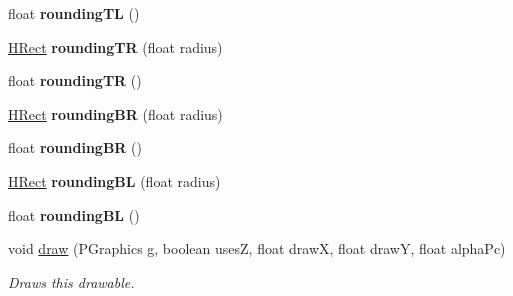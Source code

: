 \begin{DoxyCompactItemize}
\item 
\hypertarget{classhype_1_1extended_1_1drawable_1_1_h_rect_ac949ee8c38d5f35d3f440ea000406632}{float {\bfseries rounding\-T\-L} ()}\label{classhype_1_1extended_1_1drawable_1_1_h_rect_ac949ee8c38d5f35d3f440ea000406632}

\item 
\hypertarget{classhype_1_1extended_1_1drawable_1_1_h_rect_aee3e7b8de8f70b3476ec0257312e8e35}{\hyperlink{classhype_1_1extended_1_1drawable_1_1_h_rect}{H\-Rect} {\bfseries rounding\-T\-R} (float radius)}\label{classhype_1_1extended_1_1drawable_1_1_h_rect_aee3e7b8de8f70b3476ec0257312e8e35}

\item 
\hypertarget{classhype_1_1extended_1_1drawable_1_1_h_rect_a4512a97bf07ae5d008c00274dea1a8b0}{float {\bfseries rounding\-T\-R} ()}\label{classhype_1_1extended_1_1drawable_1_1_h_rect_a4512a97bf07ae5d008c00274dea1a8b0}

\item 
\hypertarget{classhype_1_1extended_1_1drawable_1_1_h_rect_a403cf9af3529a2251f9ac9316a668bab}{\hyperlink{classhype_1_1extended_1_1drawable_1_1_h_rect}{H\-Rect} {\bfseries rounding\-B\-R} (float radius)}\label{classhype_1_1extended_1_1drawable_1_1_h_rect_a403cf9af3529a2251f9ac9316a668bab}

\item 
\hypertarget{classhype_1_1extended_1_1drawable_1_1_h_rect_a37d0e960c8120b72a489c10659671a3b}{float {\bfseries rounding\-B\-R} ()}\label{classhype_1_1extended_1_1drawable_1_1_h_rect_a37d0e960c8120b72a489c10659671a3b}

\item 
\hypertarget{classhype_1_1extended_1_1drawable_1_1_h_rect_ad66438698f1bd3a33b214f3041c979b3}{\hyperlink{classhype_1_1extended_1_1drawable_1_1_h_rect}{H\-Rect} {\bfseries rounding\-B\-L} (float radius)}\label{classhype_1_1extended_1_1drawable_1_1_h_rect_ad66438698f1bd3a33b214f3041c979b3}

\item 
\hypertarget{classhype_1_1extended_1_1drawable_1_1_h_rect_acfddc39e1df383904a9c15317dae6d07}{float {\bfseries rounding\-B\-L} ()}\label{classhype_1_1extended_1_1drawable_1_1_h_rect_acfddc39e1df383904a9c15317dae6d07}

\item 
void \hyperlink{classhype_1_1extended_1_1drawable_1_1_h_rect_ac616395ca715c8fb6dddf74b203df51d}{draw} (P\-Graphics g, boolean uses\-Z, float draw\-X, float draw\-Y, float alpha\-Pc)
\begin{DoxyCompactList}\small\item\em Draws this drawable. \end{DoxyCompactList}\end{DoxyCompactItemize}
